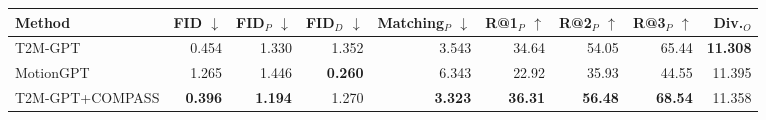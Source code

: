 \begin{tabular*}{\textwidth}{@{\extracolsep{\fill}}lrrrrrrrr@{}}
\toprule
Method & FID $\downarrow$ & FID$_P$ $\downarrow$ & FID$_D$ $\downarrow$ & Matching$_P$ $\downarrow$ & R@1$_P$ $\uparrow$ & R@2$_P$ $\uparrow$ & R@3$_P$ $\uparrow$ & Div.$_O$ \\
\midrule
T2M-GPT & 0.454 & 1.330 & 1.352 & 3.543 & 34.64 & 54.05 & 65.44 & \textbf{11.308} \\
MotionGPT & 1.265 & 1.446 & \textbf{0.260} & 6.343 & 22.92 & 35.93 & 44.55 & 11.395 \\
T2M-GPT+COMPASS & \textbf{0.396} & \textbf{1.194} & 1.270 & \textbf{3.323} & \textbf{36.31} & \textbf{56.48} & \textbf{68.54} & 11.358 \\
\bottomrule
\end{tabular*}
